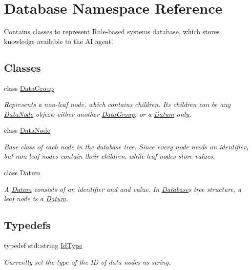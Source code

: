 \hypertarget{namespaceDatabase}{}\section{Database Namespace Reference}
\label{namespaceDatabase}


Contains classes to represent Rule-\/based system\textquotesingle{}s database, which stores knowledge available to the AI agent.  


\subsection*{Classes}
\begin{DoxyCompactItemize}
\item 
class \hyperlink{classDatabase_1_1DataGroup}{Data\+Group}
\begin{DoxyCompactList}\small\item\em Represents a non-\/leaf node, which contains children. Its children can be any \hyperlink{classDatabase_1_1DataNode}{Data\+Node} object\+: either another \hyperlink{classDatabase_1_1DataGroup}{Data\+Group}, or a \hyperlink{classDatabase_1_1Datum}{Datum} only. \end{DoxyCompactList}\item 
class \hyperlink{classDatabase_1_1DataNode}{Data\+Node}
\begin{DoxyCompactList}\small\item\em Base class of each node in the database tree. Since every node needs an identifier, but non-\/leaf nodes contain their children, while leaf nodes store values. \end{DoxyCompactList}\item 
class \hyperlink{classDatabase_1_1Datum}{Datum}
\begin{DoxyCompactList}\small\item\em A \hyperlink{classDatabase_1_1Datum}{Datum} consists of an identifier and and value. In \hyperlink{namespaceDatabase}{Database}\textquotesingle{}s tree structure, a leaf node is a \hyperlink{classDatabase_1_1Datum}{Datum}. \end{DoxyCompactList}\end{DoxyCompactItemize}
\subsection*{Typedefs}
\begin{DoxyCompactItemize}
\item 
typedef std\+::string \hyperlink{namespaceDatabase_abca840aa37b2fd02e1d82e32a8171437}{Id\+Type}
\begin{DoxyCompactList}\small\item\em Currently set the type of the ID of data nodes as string. \end{DoxyCompactList}\end{DoxyCompactItemize}



